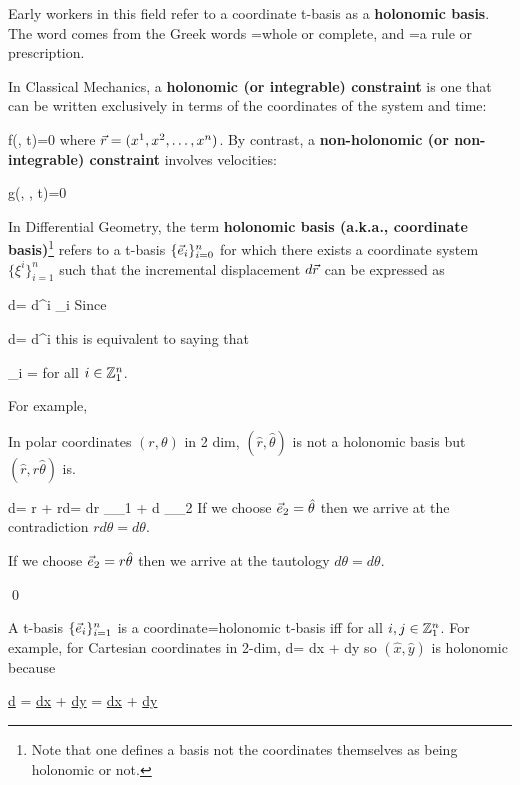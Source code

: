 Early workers in this field
refer to
a coordinate t-basis as a {\bf holonomic basis}.
The word 
comes from the Greek
words =whole or complete,
and =a rule
or prescription.


In Classical Mechanics, a {\bf holonomic (or integrable) constraint}
is one that can be
written exclusively
in terms of the coordinates of the system and time:

\beq
f(\vecr, t)=0
\eeq
where ${\vec{r}}=(x^1, x^2, \dots, x^n)$.
By contrast, a {\bf non-holonomic (or non-integrable)
constraint} involves velocities:

\beq
g(\vecr, \dot{\vecr}, t)=0
\eeq

In Differential Geometry, the term  {\bf holonomic basis (a.k.a., coordinate basis)}\footnote{Note that one defines a basis not the coordinates
themselves as
being holonomic or not.} refers to a t-basis 
$\{{\vec{e}}_i\}_{i=0}^n$
for which there exists
a coordinate system
$\{\xi^i\}_{i=1}^n$ such that
the incremental displacement $d{\vec{r}}$ can be expressed as

\beq
d\vecr = d\xi^i
\vece_i
\eeq
Since 

\beq
d\vecr = d\xi^i 
\eeq
this is equivalent to saying that


\beq
\vece_i = 
\eeq
for all $i\in{\mathbb{Z}}_1^n$.

For example, 

\begin{claim} In polar coordinates
$(r, \theta)$ in 2 dim,
$(\hat{r}, \hat{\theta}) $
is not a holonomic basis
but $(\hat{r}, r\hat{\theta})$ is.
\end{claim}
\proof

\beq 
d\vecr = r  + rd\theta \hat{\theta}=
dr 
_{\vece_1}
+ d\theta 
\underbrace{\pder{\vecr}{\theta}}
_{\vece_2}
\eeq
If we choose
$
{\vec{e}}_2=\hat{\theta}$
then we arrive at the contradiction $rd\theta = d\theta$.

If we choose 
$
{\vec{e}}_2 = r\hat{\theta}
$
then we arrive at the tautology 
$d\theta=d\theta$.


\qed


A t-basis $\{{\vec{e}}_i\}_{i=1}^n$ is a coordinate=holonomic
t-basis iff
\eeq
for all $i,j\in{\mathbb{Z}}_1^n$.
For example, for Cartesian coordinates
in 2-dim,
\beq
d\vecr = dx  + dy  
\eeq
so
$(\hat{x}, \hat{y})$
is holonomic because

\beq
\ul{d\vecr} = \ul{dx}  + \ul{dy}  
=
\ul{dx} 
+ \ul{dy} 
\eeq

